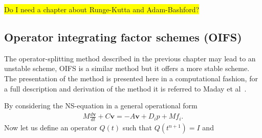 \colorbox{yellow}{Do I need a chapter about Runge-Kutta and Adam-Bashford?}



\subsection{Operator integrating factor schemes (OIFS)}
The operator-splitting method described in the previous chapter may lead to an unstable scheme,
OIFS is a similar method but it offers a more stable scheme. The presentation of the method 
is presented here in a computational fashion, for a full description and derivation of the method 
it is referred to Maday et al~\cite{raey}.

By considering the NS-equation in a general operational form 
\begin{align}
    M\frac{d \mathbf{v}}{dt} + C\mathbf{v} = -A\mathbf{v} +D_i p +Mf_i.
    \label{eq:NSoperator}
\end{align}
Now let us define an operator $Q(t)$ such that $Q(t^{n+1}) = I$ and 

